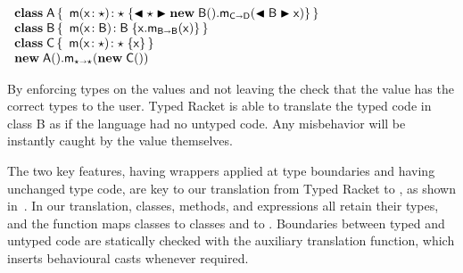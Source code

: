 \documentclass[acmlarge, anonymous, authordraft, review]{acmart} %
\begin{document}
\smallskip
\(
  \begin{array}{l}
  \Class{\xt A}{}{\Mdef\m\x\any\any{\BehCast\any{\KCall{\New{\xt B}{}}\m{\BehCast{\xt B}\x}{\C}\D }}} \\
  \Class{\xt B}{}{\Mdef\m\x{\xt B}{\xt B}{\KCall\x\m\x{\xt B}{\xt B}}} \\
  \Class{\C}{}{\Mdef\m\x{\any}{\any}{\x}} \\
  \KCall{\New{\xt A}{}}\m{\New{\xt C}{}}\any\any
  \end{array}
\)

\noindent By enforcing types on the values and not leaving
the check that the value has the correct types to the user. Typed Racket is able to 
translate the typed code in class {\xt B} as if the language had no untyped 
code. Any misbehavior will be instantly caught by the value themselves.

The two key features, having wrappers applied at type boundaries and having
unchanged type code, are key to our translation from Typed Racket to \kafka,
as shown in~. In our translation, classes, 
methods, and expressions all retain their types, and the  function maps classes to classes and \any to \any. Boundaries between typed and untyped
code are statically checked with the auxiliary translation function, which inserts behavioural casts whenever  required.
\end{document}
